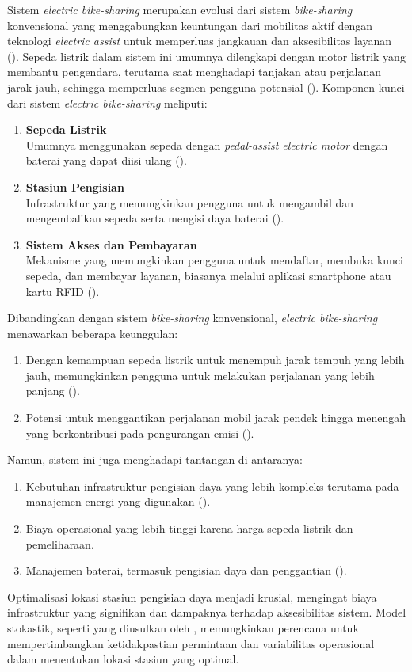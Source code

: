 Sistem \textit{electric bike-sharing} merupakan evolusi dari sistem \textit{bike-sharing} konvensional yang menggabungkan keuntungan dari mobilitas aktif dengan teknologi \textit{electric assist} untuk memperluas jangkauan dan aksesibilitas layanan (). Sepeda listrik dalam sistem ini umumnya dilengkapi dengan motor listrik yang membantu pengendara, terutama saat menghadapi tanjakan atau perjalanan jarak jauh, sehingga memperluas segmen pengguna potensial ().
Komponen kunci dari sistem \textit{electric bike-sharing} meliputi:
\begin{enumerate}
    \item \textbf{Sepeda Listrik}\\ Umumnya menggunakan sepeda dengan \textit{pedal-assist electric motor} dengan baterai yang dapat diisi ulang ().
    \item \textbf{Stasiun Pengisian}\\ Infrastruktur yang memungkinkan pengguna untuk mengambil dan mengembalikan sepeda serta mengisi daya baterai ().
    \item \textbf{Sistem Akses dan Pembayaran}\\ Mekanisme yang memungkinkan pengguna untuk mendaftar, membuka kunci sepeda, dan membayar layanan, biasanya melalui aplikasi smartphone atau kartu RFID ().
\end{enumerate}
Dibandingkan dengan sistem \textit{bike-sharing} konvensional, \textit{electric bike-sharing} menawarkan beberapa keunggulan:
\begin{enumerate}
    \item Dengan kemampuan sepeda listrik untuk menempuh jarak tempuh yang lebih jauh, memungkinkan pengguna untuk melakukan perjalanan yang lebih panjang ().
    \item Potensi untuk menggantikan perjalanan mobil jarak pendek hingga menengah yang berkontribusi pada pengurangan emisi ().
\end{enumerate}
Namun, sistem ini juga menghadapi tantangan di antaranya:
\begin{enumerate}
    \item Kebutuhan infrastruktur pengisian daya yang lebih kompleks terutama pada manajemen energi yang digunakan ().
    \item Biaya operasional yang lebih tinggi karena harga sepeda listrik dan pemeliharaan.
    \item Manajemen baterai, termasuk pengisian daya dan penggantian ().
\end{enumerate}
Optimalisasi lokasi stasiun pengisian daya menjadi krusial, mengingat biaya infrastruktur yang signifikan dan dampaknya terhadap aksesibilitas sistem. Model stokastik, seperti yang diusulkan oleh , memungkinkan perencana untuk mempertimbangkan ketidakpastian permintaan dan variabilitas operasional dalam menentukan lokasi stasiun yang optimal.

